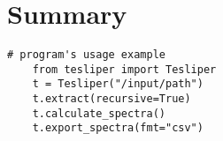 \chapter{Summary}\label{chapter:summary:en}
\begin{marginscheme}
  
\end{marginscheme}
\begin{marginfigure}
  
\end{marginfigure}
\begin{marginlisting}
  \begin{lstlisting}[emph={recursive,fmt}]
    # program's usage example
    from tesliper import Tesliper
    t = Tesliper("/input/path")
    t.extract(recursive=True)
    t.calculate_spectra()
    t.export_spectra(fmt="csv")
  \end{lstlisting}
\end{marginlisting}

